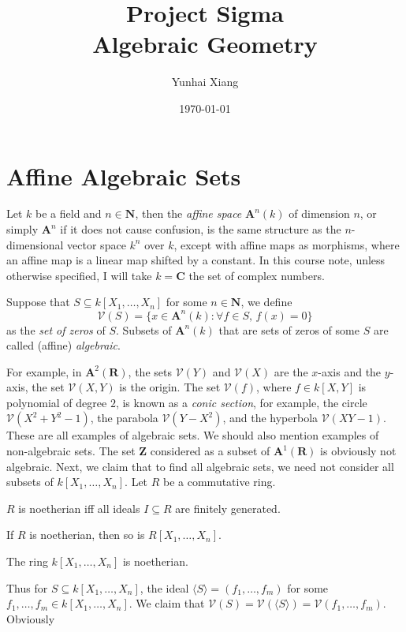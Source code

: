 \documentclass[11pt]{book}
\title{
\vspace{-2.0cm}
\Large{Project Sigma}\\
\vspace{1cm}
\huge{\bf{Algebraic Geometry}}
\vspace{3cm}}
\author{Yunhai Xiang}
\date{\today}
\begin{document}
\maketitle
\doublespacing
\tableofcontents
\singlespacing
\newpage
\chapter{Affine Algebraic Sets}
Let $k$ be a field and $n\in\mathbf N$, then the \textit{affine space} $\mathbf A^n(k)$ of dimension $n$, or simply $\mathbf A^n$ if it does not cause confusion, is the same structure as the $n$-dimensional vector space $k^n$ over $k$, except with affine maps as morphisms, where an affine map is a linear map shifted by a constant. In this course note, unless otherwise specified, I will take $k=\mathbf C$ the set of complex numbers.

\begin{definition}
Suppose that $S\subseteq k[X_1,\dots,X_n]$ for some $n\in\mathbf N$, we define
\[\mathcal{V}(S)=\{x\in \mathbf A^n(k):\forall f\in S,\,f(x)=0\}\]
as the \textit{set of zeros} of $S$. Subsets of $\mathbf A^n(k)$ that are sets of zeros of some $S$ are called (affine) \textit{algebraic}.
\end{definition}
For example, in $\mathbf{A}^2(\mathbf R)$, the sets $\mathcal{V}(Y)$ and $\mathcal{V}(X)$ are the $x$-axis and the $y$-axis, the set $\mathcal{V}(X,Y)$ is the origin. The set $\mathcal{V}(f)$, where $f\in k[X,Y]$ is polynomial of degree $2$, is known as a \textit{conic section}, for example, the circle $\mathcal{V}(X^2+Y^2-1)$, the parabola $\mathcal{V}(Y-X^2)$, and the hyperbola $\mathcal{V}(XY-1)$. These are all examples of algebraic sets. We should also mention examples of non-algebraic sets. The set $\mathbf Z$ considered as a subset of $\mathbf A^1(\mathbf R)$ is obviously not algebraic. Next, we claim that to find all algebraic sets, we need not consider all subsets of $k[X_1,\dots,X_n]$. Let $R$ be a commutative ring.
\begin{theorem}$R$ is noetherian iff all ideals $I\subseteq R$ are finitely generated.
\end{theorem}
\begin{theorem}If $R$ is noetherian, then so is $R[X_1,\dots,X_n]$.
\end{theorem}
\begin{corollary}The ring $k[X_1,\dots,X_n]$ is noetherian.
\end{corollary}
Thus for $S\subseteq k[X_1,\dots,X_n]$, the ideal $\langle S\rangle=(f_1,\dots,f_m)$ for some $f_1,\dots,f_m\in k[X_1,\dots,X_n]$. We claim that $\mathcal{V}(S)=\mathcal{V}(\langle S\rangle)=\mathcal{V}(f_1,\dots,f_m)$. Obviously 
\end{document}
